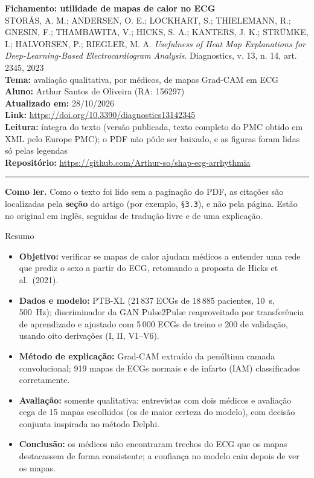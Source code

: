 \documentclass[11pt,a4paper]{article}
\begin{document}
\sloppy

\begin{center}
    {\LARGE \textbf{Fichamento: utilidade de mapas de calor no ECG}} \\[0.35em]
    {\large STORÅS, A. M.; ANDERSEN, O. E.; LOCKHART, S.; THIELEMANN, R.; GNESIN, F.; THAMBAWITA, V.; HICKS, S. A.; KANTERS, J. K.; STRÜMKE, I.; HALVORSEN, P.; RIEGLER, M. A. \textit{Usefulness of Heat Map Explanations for Deep-Learning-Based Electrocardiogram Analysis}. Diagnostics, v. 13, n. 14, art. 2345, 2023} \\[0.3em]
    \textbf{Tema:} avaliação qualitativa, por médicos, de mapas Grad-CAM em ECG \\[0.2em]
    \textbf{Aluno:} Arthur Santos de Oliveira (RA: 156297) \\[0.2em]
    \textbf{Atualizado em:} 28/10/2026 \\[0.2em]
    \textbf{Link:} \url{https://doi.org/10.3390/diagnostics13142345} \\[0.2em]
    \textbf{Leitura:} íntegra do texto (versão publicada, texto completo do PMC obtido em XML pelo Europe PMC); o PDF não pôde ser baixado, e as figuras foram lidas só pelas legendas \\[0.2em]
    \textbf{Repositório:} \url{https://github.com/Arthur-so/shap-ecg-arrhythmia}
\end{center}
\vspace{-0.5em}
\hrule
\vspace{0.8em}

\textbf{Como ler.} Como o texto foi lido sem a paginação do PDF, as citações são localizadas pela \textbf{seção} do artigo (por exemplo, \texttt{§3.3}), e não pela página. Estão no original em inglês, seguidas de tradução livre e de uma explicação.

\begin{infobox}[note]{Resumo}
\begin{itemize}
\item \textbf{Objetivo:} verificar se mapas de calor ajudam médicos a entender uma rede que prediz o sexo a partir do ECG, retomando a proposta de Hicks et al.\ (2021).
\item \textbf{Dados e modelo:} PTB-XL (21\,837 ECGs de 18\,885 pacientes, 10~s, 500~Hz); discriminador da GAN Pulse2Pulse reaproveitado por transferência de aprendizado e ajustado com 5\,000 ECGs de treino e 200 de validação, usando oito derivações (I, II, V1--V6).
\item \textbf{Método de explicação:} Grad-CAM extraído da penúltima camada convolucional; 919 mapas de ECGs normais e de infarto (IAM) classificados corretamente.
\item \textbf{Avaliação:} somente qualitativa: entrevistas com dois médicos e avaliação cega de 15 mapas escolhidos (os de maior certeza do modelo), com decisão conjunta inspirada no método Delphi.
\item \textbf{Conclusão:} os médicos não encontraram trechos do ECG que os mapas destacassem de forma consistente; a confiança no modelo caiu depois de ver os mapas.
\end{itemize}
\end{infobox}
\end{document}
